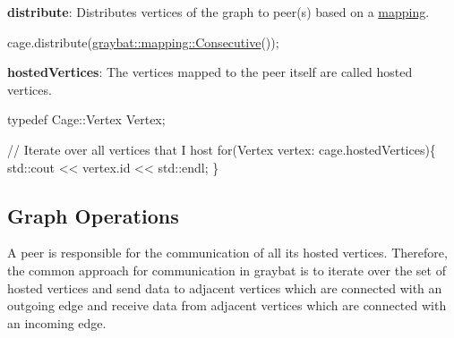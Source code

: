 \begin{DoxyEnumerate}
\item {\bfseries distribute}\+: Distributes vertices of the graph to peer(s) based on a \hyperlink{mapping}{mapping}. 
\begin{DoxyCode}
cage.distribute(\hyperlink{structgraybat_1_1mapping_1_1Consecutive}{graybat::mapping::Consecutive}());
\end{DoxyCode}

\item {\bfseries hosted\+Vertices}\+: The vertices mapped to the peer itself are called hosted vertices. 
\begin{DoxyCode}
\textcolor{keyword}{typedef} Cage::Vertex Vertex;

\textcolor{comment}{// Iterate over all vertices that I host}
\textcolor{keywordflow}{for}(Vertex vertex: cage.hostedVertices)\{
    std::cout << vertex.id << std::endl;
\}
\end{DoxyCode}

\end{DoxyEnumerate}

\subsection*{Graph Operations}

A peer is responsible for the communication of all its hosted vertices. Therefore, the common approach for communication in graybat is to iterate over the set of hosted vertices and send data to adjacent vertices which are connected with an outgoing edge and receive data from adjacent vertices which are connected with an incoming edge.


